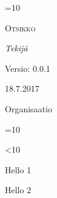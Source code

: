 \documentclass[oneside, 12pt,a4paper,finnish,sansheading]{ extarticle}
\date{}
\begin{document}
=10
\begin{titlepage}
	\centering
	\vspace*{5cm}
	{\scshape \Huge Otsikko\par}
	\vspace{2cm}
	{\Large\itshape Tekijä\par}
	\vfill
	Versio: 0.0.1 \par
	18.7.2017 \par
	\vfill
	{\large Organisaatio\par}
\end{titlepage}
\fi


\let\cleardoublepage\clearpage




=10
{
\setcounter{tocdepth}{3}
\tableofcontents
\newpage
\let\cleardoublepage\clearpage
}
\fi
 



<10
\pagestyle{myfancyfooter}
\makeatletter
\let\ps@plain\ps@fancy
\makeatother
\fi
{}


Hello 1

Hello 2
\end{document}
